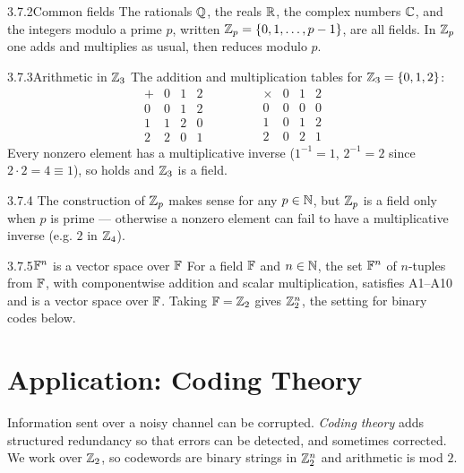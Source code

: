 \begin{exmp}{3.7.2}{Common fields}
The rationals $\mathbb{Q}$, the reals $\mathbb{R}$, the complex numbers $\mathbb{C}$, and the integers modulo a prime $p$, written $\mathbb{Z}_p=\{0,1,\dots,p-1\}$, are all fields. In $\mathbb{Z}_p$ one adds and multiplies as usual, then reduces modulo $p$.
\end{exmp}

\begin{exmp}{3.7.3}{Arithmetic in $\mathbb{Z}_3$}
The addition and multiplication tables for $\mathbb{Z}_3=\{0,1,2\}$:
\[
\begin{array}{c|ccc}
+&0&1&2\\\hline 0&0&1&2\\ 1&1&2&0\\ 2&2&0&1
\end{array}
\qquad\qquad
\begin{array}{c|ccc}
\times&0&1&2\\\hline 0&0&0&0\\ 1&0&1&2\\ 2&0&2&1
\end{array}
\]
Every nonzero element has a multiplicative inverse ($1^{-1}=1$, $2^{-1}=2$ since $2\cdot2=4\equiv1$), so  holds and $\mathbb{Z}_3$ is a field.
\end{exmp}

\begin{rmks}{3.7.4}
The construction of $\mathbb{Z}_p$ makes sense for any $p\in\mathbb{N}$, but $\mathbb{Z}_p$ is a field only when $p$ is prime --- otherwise a nonzero element can fail to have a multiplicative inverse (e.g. $2$ in $\mathbb{Z}_4$).
\end{rmks}

\begin{exmp}{3.7.5}{$\mathbb{F}^n$ is a vector space over $\mathbb{F}$}
For a field $\mathbb{F}$ and $n\in\mathbb{N}$, the set $\mathbb{F}^n$ of $n$-tuples from $\mathbb{F}$, with componentwise addition and scalar multiplication, satisfies A1--A10 and is a vector space over $\mathbb{F}$. Taking $\mathbb{F}=\mathbb{Z}_2$ gives $\mathbb{Z}_2^n$, the setting for binary codes below.
\end{exmp}

\section{Application: Coding Theory}
\label{sec:3.8}

Information sent over a noisy channel can be corrupted. \emph{Coding theory} adds structured redundancy so that errors can be detected, and sometimes corrected. We work over $\mathbb{Z}_2$, so codewords are binary strings in $\mathbb{Z}_2^n$ and arithmetic is mod $2$.

